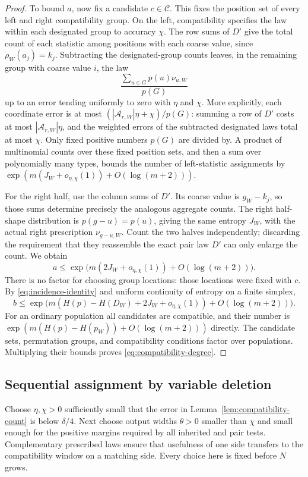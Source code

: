 \begin{proof}
To bound $a$, now fix a candidate $c\in\mathcal C$.  This fixes the
position set of every left and right compatibility group.  On the
left, compatibility specifies the law within each designated group
to accuracy $\chi$.  The row sums of $D'$ give the total count of
each statistic among positions with each coarse value, since
$\rho_W(a_j)=k_j$.  Subtracting the designated-group counts leaves, in the
remaining group with coarse value $i$, the law
\[
 \frac{\sum_{u\in G}p(u)\nu_{u,W}}{p(G)}
\]
up to an error tending uniformly to zero with $\eta$ and $\chi$.
More explicitly, each coordinate error is at most
$(|\mathcal A_{r,W}|\eta+\chi)/p(G)$: summing a row of $D'$
costs at most $|\mathcal A_{r,W}|\eta$, and the weighted errors
of the subtracted designated laws total at most $\chi$.
Only fixed positive numbers $p(G)$ are divided by.  A product of
multinomial counts over these fixed position sets, and then a sum
over polynomially many types, bounds the number of left-statistic
assignments by $\exp(m(J_W+o_{\eta,\chi}(1))+O(\log(m+2)))$.

For the right half, use the column sums of $D'$.  Its coarse value
is $g_W-k_j$, so those sums determine precisely the analogous
aggregate counts.  The right half-shape distribution is
$p(g-u)=p(u)$, giving the same entropy $J_W$, with the actual right
prescription $\nu_{g-u,W}$.  Count the two halves independently;
discarding the requirement that they reassemble the exact pair law
$D'$ can only enlarge the count.  We obtain
\[
 a\le\exp\bigl(m(2J_W+o_{\eta,\chi}(1))+O(\log(m+2))\bigr).
\]
There is no factor for choosing group locations: those locations
were fixed with $c$.  By \eqref{eq:incidence-identity} and uniform
continuity of entropy on a finite simplex,
\[
 b\le\exp\bigl(m(H(p)-H(D_W)+2J_W+o_{\eta,\chi}(1))
                         +O(\log(m+2))\bigr).
\]
For an ordinary population all candidates are compatible, and their
number is $\exp(m(H(p)-H(p_W))+O(\log(m+2)))$ directly.  The
candidate sets, permutation groups, and compatibility conditions
factor over populations.  Multiplying their bounds proves
\eqref{eq:compatibility-degree}.
\end{proof}

\subsection{Sequential assignment by variable deletion}

Choose $\eta,\chi>0$ sufficiently small that the error in
Lemma~\ref{lem:compatibility-count} is below $\delta/4$.  Next
choose output widths $\theta>0$ smaller than $\chi$ and small
enough for the positive margins required by all inherited and pair
tests.  Complementary prescribed laws ensure that usefulness of
one side transfers to the compatibility window on a matching side.
Every choice here is fixed before $N$ grows.

